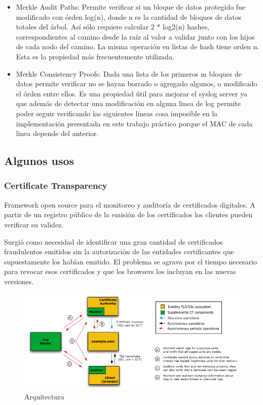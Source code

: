 \begin{itemize}

\item Merkle Audit Paths: Permite verificar si un bloque de datos protegido fue modificado con \'orden log(n), donde n es la cantidad de bloques de datos totales del \'arbol. As\'i s\'olo requiere calcular 2 * log2(n) hashes, correspondientes al camino desde la ra\'iz al valor a validar junto con los hijos de cada nodo del camino. La misma operaci\'on en listas de hash tiene orden n. Esta es la propiedad más frecuentemente utilizada.

\item Merkle Consistency Proofs: Dada una lista de los primeros m bloques de datos permite verificar no se hayan borrado o agregado algunos, o modificado el \'orden entre ellos. Es una propiedad \'util para mejorar el syslog server ya que además de detectar una modificación en alguna linea de log permite poder seguir verificando las siguientes lineas cosa imposible en la implementación presentada en este trabajo práctico porque el MAC de cada linea depende del anterior.

\end{itemize}


\subsection{Algunos usos}

\subsubsection{Certificate Transparency}
Framework open source para el monitoreo y auditor\'ia de certificados digitales. A partir de un registro p\'ublico de la emisi\'on de los certificados los clientes pueden verificar su validez.

Surgió como necesidad de identificar una gran cantidad de certificados fraudulentos emitidos sin la autorización de las entidades certificantes que supuestamente los habían emitido. El problema se agrava por el tiempo necesario para revocar esos certificados y que los browsers los incluyan en las nuevas versiones.

\begin{figure}[H]
  \centering
  \includegraphics[scale=0.6]{imagenes/ct_system.png}
  \caption{Arquitectura}
\end{figure}

